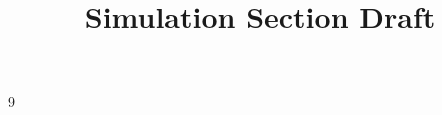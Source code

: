 \documentclass[journal,10pt]{IEEEtran}
\title{Simulation Section Draft}
\author{}
\begin{document}
\maketitle
\raggedbottom
\setcounter{section}{4}

\clearpage
\appendices

\begin{thebibliography}{9}

\end{thebibliography}
\end{document}
